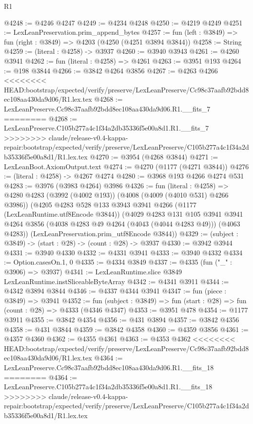 \begin{lexlean}{R1}
\begin{coremodule}
{{{{{{{{{{{{{{{{{{{{{{{{{{{{{{{{{{{{{{{{{{{{{{{{{{{{{{{{{{{{{{{{{{{{{{{{{{{{{{{{{{{{{{{{{{{{{{{{{{{{{{{{{{{{{{{{{{{{{{{{{{{{{{{{{{{{{{{{{{{{{{{{{{{{{{{{{{{{{{{{{{{{{{{{{{{{{{{{{{{{{{{{{{@4248 := @4246 @4247
@4249 := @4234 @4248
@4250 := @4219 @4249
@4251 := LexLeanPreservation.prim_append_bytes
@4257 := fun (left : @3849) => fun (right : @3849) => @4203 (@4250 (@4251 @3894 @3844))
@4258 := String
@4259 := (literal : @4258) -> @3937
@4260 := @3940 @3943
@4261 := @4260 @3941
@4262 := fun (literal : @4258) => @4261
@4263 := @3951 @193
@4264 := @198 @3844
@4266 := @3842 @4264 @3856
@4267 := @4263 @4266
<<<<<<<< HEAD:bootstrap/expected/verify/preserve/LexLeanPreserve/Cc98c37aafb92bdd8ec108aa430da9d06/R1.lex.tex
@4268 := LexLeanPreserve.Cc98c37aafb92bdd8ec108aa430da9d06.R1.__fits_7
========
@4268 := LexLeanPreserve.C105b277a4c1f34a2db35336f5e00a8d1.R1.__fits_7
>>>>>>>> claude/release-v0.4-kappa-repair:bootstrap/expected/verify/preserve/LexLeanPreserve/C105b277a4c1f34a2db35336f5e00a8d1/R1.lex.tex
@4270 := @3954 (@4268 @3844)
@4271 := LexLeanBoot.AxiomOutput.text
@4274 := @4270 (@1177 (@4271 @3844))
@4276 := (literal : @4258) -> @4267 @4274
@4280 := @3968 @193 @4266 @4274 @531
@4283 := @3976 (@3983 @4264) @3986
@4326 := fun (literal : @4258) =>
  @4280
    @4283
    (@3992 (@4002 @193))
    (@4008 (@4009 (@4010 @531) @4266 @3986))
    (@4205
      @4283
      @528
      @133
      @3943
      @3941
      @4266
      (@1177 (LexLeanRuntime.utf8Encode @3844))
      (@4029
        @4283
        @131
        @105
        @3941
        @3941
        @4264
        @3856
        (@4038 @4283 @49 @4264 (@4043 (@4044 @4283 @49)))
        (@4063 @4283))
      (LexLeanPreservation.prim_utf8Encode @3844))
@4329 := (subject : @3849) -> (start : @28) -> (count : @28) -> @3937
@4330 := @3942 @3944
@4331 := @3940 @4330
@4332 := @4331 @3941
@4333 := @3940 @4332
@4334 := Option.casesOn.{1, 0}
@4335 := @4334 @3849
@4337 := @4335 (fun ("_" : @3906) => @3937)
@4341 := LexLeanRuntime.slice @3849 LexLeanRuntime.instSliceableByteArray
@4342 := @4341 @3911
@4344 := @4342 @3894 @3844
@4346 := @4337 @4344 @3941
@4347 := fun (piece : @3849) => @3941
@4352 := fun (subject : @3849) => fun (start : @28) => fun (count : @28) => @4333 (@4346 @4347)
@4353 := @3951 @478
@4354 := @1177 @3911
@4355 := @3842 @4354
@4356 := @431 @3894
@4357 := @3842 @4356
@4358 := @431 @3844
@4359 := @3842 @4358
@4360 := @4359 @3856
@4361 := @4357 @4360
@4362 := @4355 @4361
@4363 := @4353 @4362
<<<<<<<< HEAD:bootstrap/expected/verify/preserve/LexLeanPreserve/Cc98c37aafb92bdd8ec108aa430da9d06/R1.lex.tex
@4364 := LexLeanPreserve.Cc98c37aafb92bdd8ec108aa430da9d06.R1.__fits_18
========
@4364 := LexLeanPreserve.C105b277a4c1f34a2db35336f5e00a8d1.R1.__fits_18
>>>>>>>> claude/release-v0.4-kappa-repair:bootstrap/expected/verify/preserve/LexLeanPreserve/C105b277a4c1f34a2db35336f5e00a8d1/R1.lex.tex
}}}}}}}}}}}}}}}}}}}}}}}}}}}}}}}}}}}}}}}}}}}}}}}}}}}}}}}}}}}}}}}}}}}}}}}}}}}}}}}}}}}}}}}}}}}}}}}}}}}}}}}}}}}}}}}}}}}}}}}}}}}}}}}}}}}}}}}}}}}}}}}}}}}}}}}}}}}}}}}}}}}}}}}}}}}}}}}}}}}}}}}}}}
\end{coremodule}
\end{lexlean}

